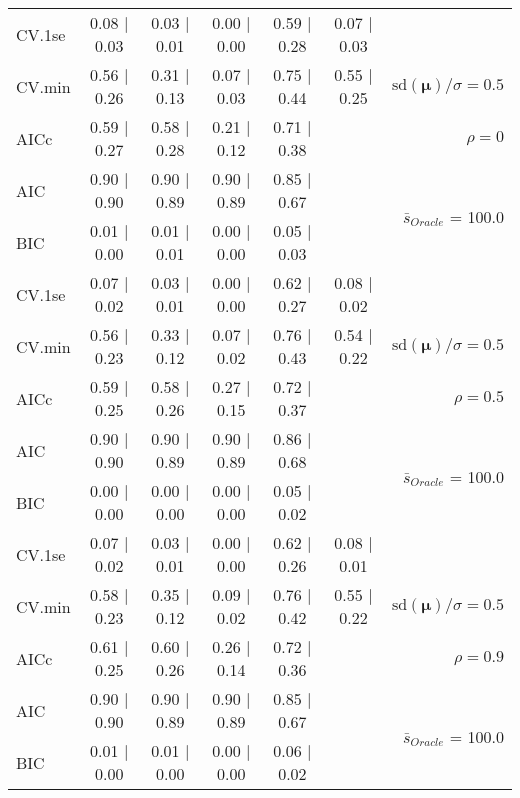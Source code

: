 \begin{table}
\begin{center}
\begin{tabular}{l*{5}{c}|r}
 \hline 
CV.1se & 0.08 $\mid$ 0.03 & 0.03 $\mid$ 0.01 & 0.00 $\mid$ 0.00 & 0.59 $\mid$ 0.28 & 0.07 $\mid$ 0.03 & \\
CV.min & 0.56 $\mid$ 0.26 & 0.31 $\mid$ 0.13 & 0.07 $\mid$ 0.03 & 0.75 $\mid$ 0.44 & 0.55 $\mid$ 0.25 &  $\mathrm{sd}(\mathbf{\mu})/\sigma=0.5$ \\
AICc & 0.59 $\mid$ 0.27 & 0.58 $\mid$ 0.28 & 0.21 $\mid$ 0.12 & 0.71 $\mid$ 0.38 & & $\rho=0$ \\
AIC & 0.90 $\mid$ 0.90 & 0.90 $\mid$ 0.89 & 0.90 $\mid$ 0.89 & 0.85 $\mid$ 0.67 & &  \multirow{2}{*}{$\bar{s}_{Oracle}$ = 100.0} \\
BIC & 0.01 $\mid$ 0.00 & 0.01 $\mid$ 0.01 & 0.00 $\mid$ 0.00 & 0.05 $\mid$ 0.03 & &  \\
 \hline 
CV.1se & 0.07 $\mid$ 0.02 & 0.03 $\mid$ 0.01 & 0.00 $\mid$ 0.00 & 0.62 $\mid$ 0.27 & 0.08 $\mid$ 0.02 & \\
CV.min & 0.56 $\mid$ 0.23 & 0.33 $\mid$ 0.12 & 0.07 $\mid$ 0.02 & 0.76 $\mid$ 0.43 & 0.54 $\mid$ 0.22 &  $\mathrm{sd}(\mathbf{\mu})/\sigma=0.5$ \\
AICc & 0.59 $\mid$ 0.25 & 0.58 $\mid$ 0.26 & 0.27 $\mid$ 0.15 & 0.72 $\mid$ 0.37 & & $\rho=0.5$ \\
AIC & 0.90 $\mid$ 0.90 & 0.90 $\mid$ 0.89 & 0.90 $\mid$ 0.89 & 0.86 $\mid$ 0.68 & &  \multirow{2}{*}{$\bar{s}_{Oracle}$ = 100.0} \\
BIC & 0.00 $\mid$ 0.00 & 0.00 $\mid$ 0.00 & 0.00 $\mid$ 0.00 & 0.05 $\mid$ 0.02 & &  \\
 \hline 
CV.1se & 0.07 $\mid$ 0.02 & 0.03 $\mid$ 0.01 & 0.00 $\mid$ 0.00 & 0.62 $\mid$ 0.26 & 0.08 $\mid$ 0.01 & \\
CV.min & 0.58 $\mid$ 0.23 & 0.35 $\mid$ 0.12 & 0.09 $\mid$ 0.02 & 0.76 $\mid$ 0.42 & 0.55 $\mid$ 0.22 &  $\mathrm{sd}(\mathbf{\mu})/\sigma=0.5$ \\
AICc & 0.61 $\mid$ 0.25 & 0.60 $\mid$ 0.26 & 0.26 $\mid$ 0.14 & 0.72 $\mid$ 0.36 & & $\rho=0.9$ \\
AIC & 0.90 $\mid$ 0.90 & 0.90 $\mid$ 0.89 & 0.90 $\mid$ 0.89 & 0.85 $\mid$ 0.67 & &  \multirow{2}{*}{$\bar{s}_{Oracle}$ = 100.0} \\
BIC & 0.01 $\mid$ 0.00 & 0.01 $\mid$ 0.00 & 0.00 $\mid$ 0.00 & 0.06 $\mid$ 0.02 & &  \\
 \hline 
\end{tabular}
\end{center}
\vspace{-1cm}
\end{table}




